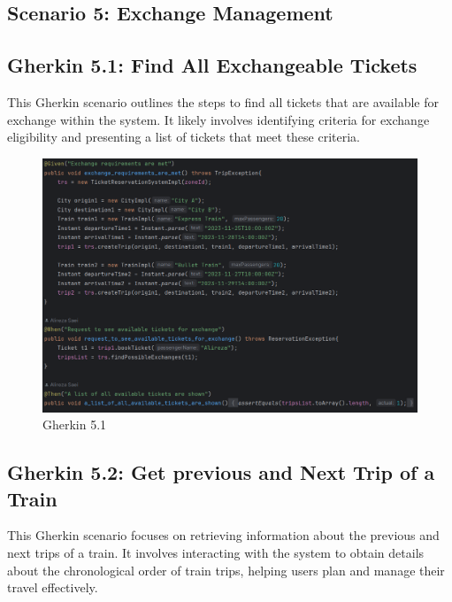 \documentclass{article}
\begin{document}
\pagebreak

\subsection{Scenario 5: Exchange Management}
\subsection{Gherkin 5.1: Find All Exchangeable Tickets}

This Gherkin scenario outlines the steps to find all tickets that are available for exchange within the system. It likely involves identifying criteria for exchange eligibility and presenting a list of tickets that meet these criteria.

\begin{figure}[h]
  \centering
  \includegraphics[width=1.0\textwidth]{pictures/T5-1.png}
  \caption{Gherkin 5.1}
  \label{fig:your_label}
\end{figure}

\pagebreak

\subsection{Gherkin 5.2: Get previous and Next Trip of a Train}

This Gherkin scenario focuses on retrieving information about the previous and next trips of a train. It involves interacting with the system to obtain details about the chronological order of train trips, helping users plan and manage their travel effectively.
\end{document}
